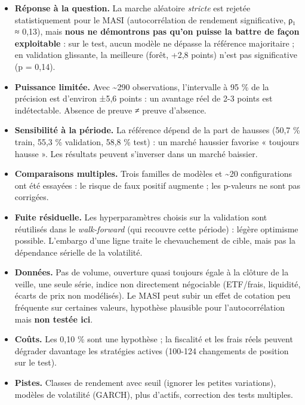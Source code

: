 \documentclass[
  10pt,
]{article}
\providecommand{\tightlist}{%
  \setlength{\itemsep}{0pt}\setlength{\parskip}{0pt}}
\begin{document}
\begin{itemize}
\tightlist
\item
  \textbf{Réponse à la question.} La marche aléatoire \emph{stricte} est
  rejetée statistiquement pour le MASI (autocorrélation de rendement
  significative, ρ₁ ≈ 0,13), mais \textbf{nous ne démontrons pas qu'on
  puisse la battre de façon exploitable} : sur le test, aucun modèle ne
  dépasse la référence majoritaire ; en validation glissante, la
  meilleure (forêt, +2,8 points) n'est pas significative (p = 0,14).
\item
  \textbf{Puissance limitée.} Avec \textasciitilde290 observations,
  l'intervalle à 95 \% de la précision est d'environ ±5,6 points : un
  avantage réel de 2-3 points est indétectable. Absence de preuve ≠
  preuve d'absence.
\item
  \textbf{Sensibilité à la période.} La référence dépend de la part de
  hausses (50,7 \% train, 55,3 \% validation, 58,8 \% test) : un marché
  haussier favorise « toujours hausse ». Les résultats peuvent
  s'inverser dans un marché baissier.
\item
  \textbf{Comparaisons multiples.} Trois familles de modèles et
  \textasciitilde20 configurations ont été essayées : le risque de faux
  positif augmente ; les p-valeurs ne sont pas corrigées.
\item
  \textbf{Fuite résiduelle.} Les hyperparamètres choisis sur la
  validation sont réutilisés dans le \emph{walk-forward} (qui recouvre
  cette période) : légère optimisme possible. L'embargo d'une ligne
  traite le chevauchement de cible, mais pas la dépendance sérielle de
  la volatilité.
\item
  \textbf{Données.} Pas de volume, ouverture quasi toujours égale à la
  clôture de la veille, une seule série, indice non directement
  négociable (ETF/frais, liquidité, écarts de prix non modélisés). Le
  MASI peut subir un effet de cotation peu fréquente sur certaines
  valeurs, hypothèse plausible pour l'autocorrélation mais \textbf{non
  testée ici}.
\item
  \textbf{Coûts.} Les 0,10 \% sont une hypothèse ; la fiscalité et les
  frais réels peuvent dégrader davantage les stratégies actives (100-124
  changements de position sur le test).
\item
  \textbf{Pistes.} Classes de rendement avec seuil (ignorer les petites
  variations), modèles de volatilité (GARCH), plus d'actifs, correction
  des tests multiples.
\end{itemize}
\end{document}
